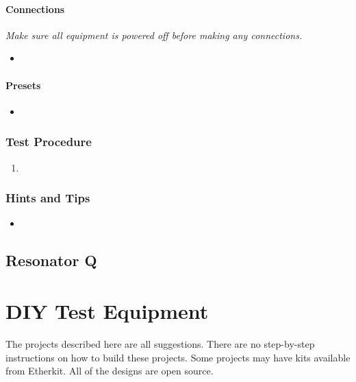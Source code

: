\documentclass[10pt,letterpaper]{book}
\begin{document}
\subsubsection*{Connections}
\emph{Make sure all equipment is powered off before making any connections.}
\begin{itemize}
	\item
\end{itemize}
\subsubsection*{Presets}
\begin{itemize}
	\item
\end{itemize}
\subsection*{Test Procedure}
\begin{enumerate}
	\item  
\end{enumerate}

\subsection*{Hints and Tips}
\begin{itemize}
	\item
\end{itemize}
\newpage

\section{Resonator Q}
\chapter{DIY Test Equipment}
The projects described here are all suggestions. There are no step-by-step instructions on how to build these projects. Some projects may have kits available from Etherkit. All of the designs are open source.
\end{document}
